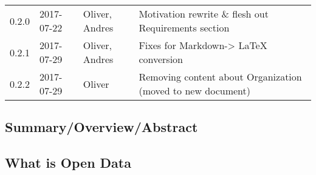 \begin{longtable}[]{@{}llll@{}}
\begin{minipage}[t]{0.10\columnwidth}
0.2.0\strut
\end{minipage} & \begin{minipage}[t]{0.06\columnwidth}\raggedright\strut
2017-07-22\strut
\end{minipage} & \begin{minipage}[t]{0.15\columnwidth}\raggedright\strut
Oliver, Andres\strut
\end{minipage} & \begin{minipage}[t]{0.23\columnwidth}\raggedright\strut
Motivation rewrite \& flesh out Requirements section\strut
\end{minipage}\tabularnewline
\begin{minipage}[t]{0.10\columnwidth}\raggedright\strut
0.2.1\strut
\end{minipage} & \begin{minipage}[t]{0.06\columnwidth}\raggedright\strut
2017-07-29\strut
\end{minipage} & \begin{minipage}[t]{0.15\columnwidth}\raggedright\strut
Oliver, Andres\strut
\end{minipage} & \begin{minipage}[t]{0.23\columnwidth}\raggedright\strut
Fixes for Markdown-\textgreater{} LaTeX conversion\strut
\end{minipage}\tabularnewline
\begin{minipage}[t]{0.10\columnwidth}\raggedright\strut
0.2.2\strut
\end{minipage} & \begin{minipage}[t]{0.06\columnwidth}\raggedright\strut
2017-07-29\strut
\end{minipage} & \begin{minipage}[t]{0.15\columnwidth}\raggedright\strut
Oliver\strut
\end{minipage} & \begin{minipage}[t]{0.23\columnwidth}\raggedright\strut
Removing content about Organization (moved to new document)\strut
\end{minipage}\tabularnewline
\bottomrule
\end{longtable}

\subsection{Summary/Overview/Abstract}\label{summaryoverviewabstract}

\subsection{What is Open Data}\label{what-is-open-data}

